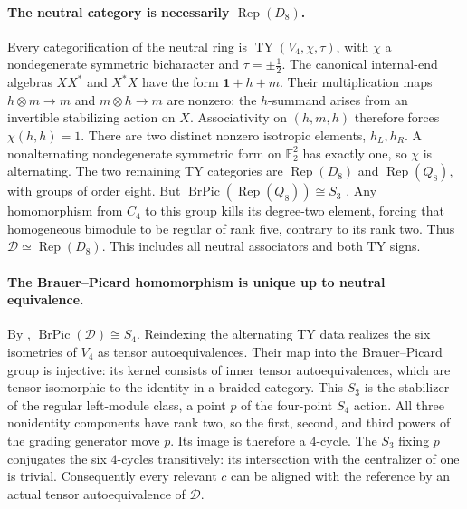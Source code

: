\paragraph{The neutral category is necessarily $\operatorname{Rep}(D_8)$.}
Every categorification of the neutral ring is
$\operatorname{TY}(V_4,\chi,\tau)$, with $\chi$ a nondegenerate symmetric
bicharacter and $\tau=\pm\tfrac12$.
The canonical internal-end algebras $XX^*$ and $X^*X$ have the form
$\mathbf1+h+m$. Their multiplication maps $h\otimes m\to m$ and
$m\otimes h\to m$ are nonzero: the $h$-summand arises from an invertible
stabilizing action on $X$. Associativity on $(h,m,h)$ therefore forces
$\chi(h,h)=1$. There are two distinct nonzero isotropic elements,
$h_L,h_R$. A nonalternating nondegenerate symmetric form on
$\mathbb F_2^2$ has exactly one, so $\chi$ is alternating.
The two remaining TY categories are $\operatorname{Rep}(D_8)$ and
$\operatorname{Rep}(Q_8)$, with groups of order eight.
But $\operatorname{BrPic}(\operatorname{Rep}(Q_8))\cong S_3$
\cite[Remark~9.4]{NikshychRiepel}. Any homomorphism from $C_4$ to this
group kills its degree-two element, forcing that homogeneous bimodule
to be regular of rank five, contrary to its rank two.
Thus $\mathcal D\simeq\operatorname{Rep}(D_8)$. This includes all neutral
associators and both TY signs.

\paragraph{The Brauer--Picard homomorphism is unique up to neutral equivalence.}
By \cite[Section~9.1]{NikshychRiepel},
$\operatorname{BrPic}(\mathcal D)\cong S_4$.
Reindexing the alternating TY data realizes the six isometries of $V_4$
as tensor autoequivalences. Their map into the Brauer--Picard group is
injective: its kernel consists of inner tensor autoequivalences, which
are tensor isomorphic to the identity in a braided category.
This $S_3$ is the stabilizer of the regular left-module class, a point
$p$ of the four-point $S_4$ action.
All three nonidentity components have rank two, so the first, second,
and third powers of the grading generator move $p$. Its image is
therefore a $4$-cycle. The $S_3$ fixing $p$ conjugates the six $4$-cycles
transitively: its intersection with the centralizer of one is trivial.
Consequently every relevant $c$ can be aligned with the reference by
an actual tensor autoequivalence of $\mathcal D$.

